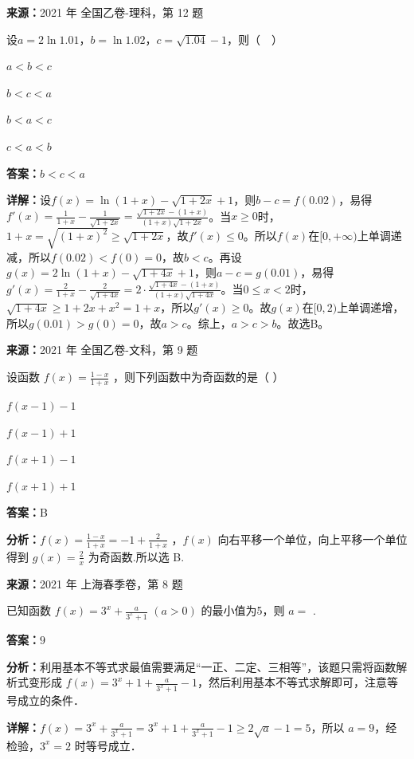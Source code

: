 \begin{question}[points=5]
\textbf{来源：}2021 年 全国乙卷-理科，第 12 题\par
设$a=2\ln1.01$，$b=\ln1.02$，$c=\sqrt{1.04}-1$，则（  ）
\begin{choices}
  \item $a<b<c$
  \item $b<c<a$
  \item $b<a<c$
  \item $c<a<b$
\end{choices}
\begin{solution}
\textbf{答案：}$b<c<a$

\textbf{详解：}设$f(x)=\ln(1+x)-\sqrt{1+2x}+1$，则$b-c=f(0.02)$，易得$f'(x)=\frac{1}{1+x}-\frac{1}{\sqrt{1+2x}}=\frac{\sqrt{1+2x}-(1+x)}{(1+x)\sqrt{1+2x}}$。当$x\geq0$时，$1+x=\sqrt{(1+x)^2}\geq\sqrt{1+2x}$，故$f'(x)\leq0$。所以$f(x)$在$[0,+\infty)$上单调递减，所以$f(0.02)<f(0)=0$，故$b<c$。再设$g(x)=2\ln(1+x)-\sqrt{1+4x}+1$，则$a-c=g(0.01)$，易得$g'(x)=\frac{2}{1+x}-\frac{2}{\sqrt{1+4x}}=2\cdot\frac{\sqrt{1+4x}-(1+x)}{(1+x)\sqrt{1+4x}}$。当$0\leq x<2$时，$\sqrt{1+4x}\geq 1+2x+x^2=1+x$，所以$g'(x)\geq0$。故$g(x)$在$[0,2)$上单调递增，所以$g(0.01)>g(0)=0$，故$a>c$。综上，$a>c>b$。故选B。
\end{solution}
\end{question}

\begin{question}[points=5]
\textbf{来源：}2021 年 全国乙卷-文科，第 9 题\par
设函数 $f(x) = \frac{1-x}{1+x}$ ，则下列函数中为奇函数的是（ ）
\begin{choices}
  \item $f(x-1)-1$
  \item $f(x-1)+1$
  \item $f(x+1)-1$
  \item $f(x+1)+1$
\end{choices}
\begin{solution}
\textbf{答案：}B

\textbf{分析：}$f(x) = \frac{1-x}{1+x} = -1 + \frac{2}{1+x}$ ，$f(x)$ 向右平移一个单位，向上平移一个单位得到 $g(x) = \frac{2}{x}$ 为奇函数.所以选 B.
\end{solution}
\end{question}

\begin{question}[points=5]
\textbf{来源：}2021 年 上海春季卷，第 8 题\par
已知函数 $f(x)=3^x+\frac{a}{3^x+1}$ $(a>0)$ 的最小值为5，则 $a=$  .
\fillin[{$9$}]
\begin{solution}
\textbf{答案：}$9$

\textbf{分析：}利用基本不等式求最值需要满足“一正、二定、三相等”，该题只需将函数解析式变形成 $f(x)=3^x+1+\frac{a}{3^x+1}-1$，然后利用基本不等式求解即可，注意等号成立的条件．

\textbf{详解：}$f(x)=3^x+\frac{a}{3^x+1}=3^x+1+\frac{a}{3^x+1}-1\geq 2\sqrt{a}-1=5$，所以 $a=9$，经检验，$3^x=2$ 时等号成立．
\end{solution}
\end{question}


